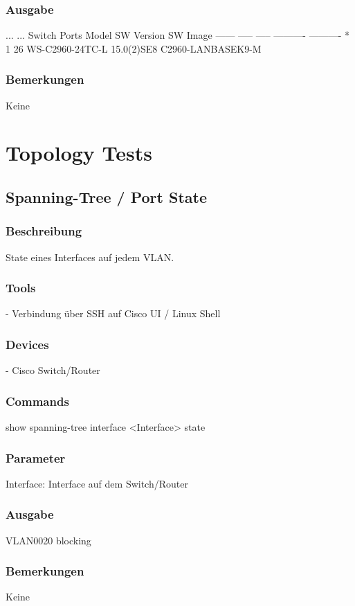 \documentclass[a4,12pt]{scrartcl}
\begin{document}
\subsubsection{Ausgabe}
...\newline
...\newline
Switch Ports Model              SW Version            SW Image\newline
------ ----- -----              ----------            ----------\newline
*    1 26    WS-C2960-24TC-L    15.0(2)SE8            C2960-LANBASEK9-M
\subsubsection{Bemerkungen}
Keine

\newpage
\section{Topology Tests}

\subsection{Spanning-Tree / Port State}
\subsubsection{Beschreibung}
State eines Interfaces auf jedem VLAN.
\subsubsection{Tools}
- Verbindung über SSH auf Cisco UI / Linux Shell
\subsubsection{Devices}
- Cisco Switch/Router
\subsubsection{Commands}
show spanning-tree interface <Interface> state
\subsubsection{Parameter}
Interface: Interface auf dem Switch/Router
\subsubsection{Ausgabe}
VLAN0020            blocking
\subsubsection{Bemerkungen}
Keine
\end{document}
